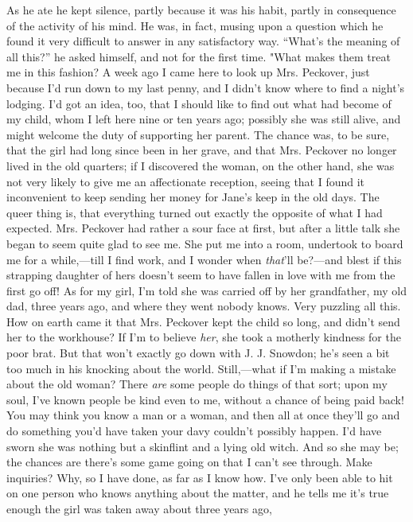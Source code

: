 As he ate he kept silence, partly because it was his habit, partly in
consequence of the activity of his mind. He was, in fact, musing upon a
question which he found it very difficult to answer in any satisfactory
way. ``What's the meaning of all this?'' he asked himself, and not for
the first time. "What makes them treat me in this fashion? A week ago I
came here to look up Mrs. Peckover, just because I'd run down to my last
penny, and I didn't know where to find a night's lodging. I'd got an
idea, too, that I should like to find out what had become of my child,
whom I left here nine or ten years ago; possibly she was still alive,
and might welcome the duty of supporting her parent. The chance was, to
be sure, that the girl had long since been in her grave, and that Mrs.
Peckover no longer lived in the old quarters; if I discovered the woman,
{}on the other hand, she was not very likely to give me an affectionate
reception, seeing that I found it inconvenient to keep sending her money
for Jane's keep in the old days. The queer thing is, that everything
turned out exactly the opposite of what I had expected. Mrs. Peckover
had rather a sour face at first, but after a little talk she began to
seem quite glad to see me. She put me into a room, undertook to board me
for a while,---till I find work, and I wonder when \emph{that}'ll
be?---and blest if this strapping daughter of hers doesn't seem to have
fallen in love with me from the first go off! As for my girl, I'm told
she was carried off by her grandfather, my old dad, three years ago, and
where they went nobody knows. Very puzzling all this. How on earth came
it that Mrs. Peckover kept the child so long, and didn't send her to the
workhouse? If I'm to believe \emph{her}, she took a motherly kindness
for the poor brat. But that won't exactly go down with J. J. Snowdon;
he's seen a bit too much in his knocking about the world. Still,---what
if I'm making a mistake about {}the old woman? There \emph{are} some
people do things of that sort; upon my soul, I've known people be kind
even to me, without a chance of being paid back! You may think you know
a man or a woman, and then all at once they'll go and do something you'd
have taken your davy couldn't possibly happen. I'd have sworn she was
nothing but a skinflint and a lying old witch. And so she may be; the
chances are there's some game going on that I can't see through. Make
inquiries? Why, so I have done, as far as I know how. I've only been
able to hit on one person who knows anything about the matter, and he
tells me it's true enough the girl was taken away about three years ago,
